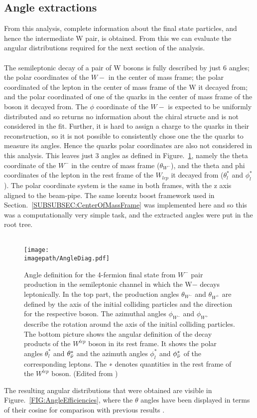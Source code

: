 \subsection{Angle extractions}
\label{SUBSEC:AngleExtractions}
From this analysis, complete information about the final state particles, and hence the intermediate W pair, is obtained. From this we can evaluate the angular distributions required for the next section of the analysis.
\\\\
The semileptonic decay of a pair of W bosons is fully described by just 6 angles; the polar coordinates of the ${W}{-}$ in the center of mass frame; the polar coordinated of the lepton in the center of mass frame of the W it decayed from; and the polar coordinated of one of the quarks in the center of mass frame of the boson it decayed from. The $\phi$ coordinate of the ${W}{-}$ is expected to be uniformly distributed and so returns no information about the chiral structe and is not considered in the fit. Further, it is hard to assign a charge to the quarks in their reconstruction, so it is not possible to consistently chose one the the quarks to measure its angles. Hence the quarks polar coordinates are also not considered in this analysis. This leaves just 3 angles as defined in Figure.~\ref{FIG:Angles}, namely the theta coordinate of the ${W}^{-}$ in the centre of mass frame (${\theta}_{{W}^{-}}$), and the theta and phi coordinates of the lepton in the rest frame of the ${W}_{lep}$ it decayed from (${\theta}_{l}^{*}$ and ${\phi}_{l}^{*}$). The polar coordinate system is the same in both frames, with the z axis aligned to the beam-pipe. The same lorentz boost framework used in Section.~\ref{SUBSUBSEC:CenterOfMassFrame} was implemented here and so this was a computationally very simple task, and the extracted angles were put in the root tree.
\\\\
\begin{figure}
    \texttt{[image: \\imagepath/AngleDiag.pdf]}
    \caption{
    Angle definition for the 4-fermion final state from ${W}^{-}$ pair production in the semileptonic channel in which the W− decays leptonically. In the top part, the production angles ${\theta}_{{W}^{-}}$ and ${\theta}_{{W}^{+}}$ are defined by the axis of the initial colliding particles and the direction for the respective boson. The azimuthal angles ${\phi}_{{W}^{-}}$ and ${\phi}_{{W}^{+}}$ describe the rotation around the axis of the initial colliding particles.\\
    The bottom picture shows the angular definition of the decay products of the ${W}^{lep}$ boson in its rest frame. It shows the polar angles ${\theta}_{l}^{*}$ and ${\theta}_{\bar{\nu}}^{*}$ and the azimuth angles ${\phi}_{l}^{*}$ and ${\phi}_{\bar{\nu}}^{*}$ of the corresponding leptons. The ∗ denotes quantities in the rest frame of the ${W}^{lep}$ boson. (Edited from \cite{Karl:424633})
      }
    \label{FIG:Angles}
\end{figure}
The resulting angular distributions that were obtained are visible in Figure.~\ref{FIG:AngleEfficiencies}, where the $\theta$ angles have been displayed in terms of their cosine for comparison with previous results \cite{Karl:424633}.
